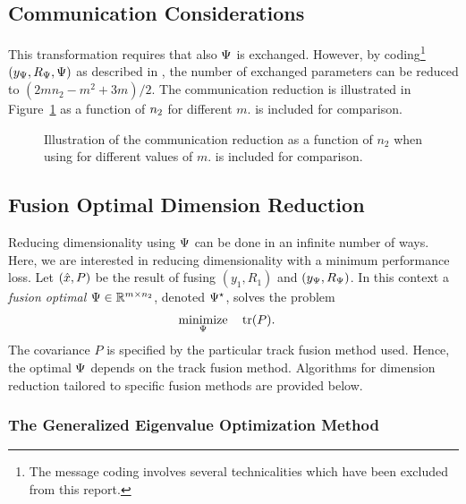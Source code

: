 \subsection{Communication Considerations}

This transformation requires that also $\M$ is exchanged. However, by coding\footnote{The message coding involves several technicalities which have been excluded from this report.} $(\yM,\RM,\M)$ as described in \cite[Section~5.1.4]{Forsling2023Phd}, the number of exchanged parameters can be reduced to $(2mn_2-m^2+3m)/2$. The communication reduction is illustrated in Figure~\ref{fig:dr:communication-gain} as a function of $\nb$ for different $m$. \abbrDCA is included for comparison.

\begin{figure}[tb]
	\centering
	\begin{tikzpicture}[scale=1.1]
		
	\end{tikzpicture}
	\caption{Illustration of the communication reduction as a function of $n_2$ when using \abbrDR for different values of $m$. \abbrDCA is included for comparison. }
	\label{fig:dr:communication-gain}
\end{figure}


\subsection{Fusion Optimal Dimension Reduction}

Reducing dimensionality using $\M$ can be done in an infinite number of ways. Here, we are interested in reducing dimensionality with a minimum performance loss. Let $(\xhat,P)$ be the result of fusing $(y_1,R_1)$ and $(\yM,\RM)$. In this context a \emph{fusion optimal} $\M\in\realsmnb$, denoted $\Mopt$, solves the problem
\begin{equation}
	\begin{aligned}
		& \underset{\M}{\minimize} & & \trace(P).
	\end{aligned}	
	\label{eq:opt:dr:gevo}
\end{equation}
The covariance $P$ is specified by the particular track fusion method used. Hence, the optimal $\M$ depends on the track fusion method. Algorithms for dimension reduction tailored to specific fusion methods are provided below.


\subsubsection{The Generalized Eigenvalue Optimization Method}

